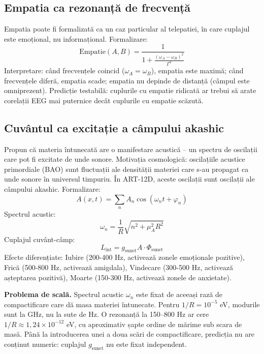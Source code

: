 \documentclass[11pt,a4paper]{article}
\begin{document}
\subsection{Empatia ca rezonanță de frecvență}
Empatia poate fi formalizată ca un caz particular al telepatiei, în care cuplajul este emoțional, nu informațional. Formalizare: 
\begin{equation}
\text{Empatie}(A,B) = \frac{1}{1 + \frac{(\omega_A - \omega_B)^2}{\Gamma^2}}
\end{equation}
Interpretare: când frecvențele coincid ($\omega_A = \omega_B$), empatia este maximă; când frecvențele diferă, empatia scade; empatia nu depinde de distanță (câmpul este omniprezent). Predicție testabilă: cuplurile cu empatie ridicată ar trebui să arate corelații EEG mai puternice decât cuplurile cu empatie scăzută.

\subsection{Cuvântul ca excitație a câmpului akashic}
Propun că materia întunecată are o manifestare acustică – un spectru de oscilații care pot fi excitate de unde sonore. Motivația cosmologică: oscilațiile acustice primordiale (BAO) sunt fluctuații ale densității materiei care s-au propagat ca unde sonore în universul timpuriu. În ART-12D, aceste oscilații sunt oscilații ale câmpului akashic. Formalizare:
\begin{equation}
A(x,t) = \sum_n A_n \cos(\omega_n t + \varphi_n)
\end{equation}
Spectrul acustic:
\begin{equation}
\omega_n = \frac{1}{R} \sqrt{n^2 + \mu_A^2 R^2}
\end{equation}
Cuplajul cuvânt-câmp:
\begin{equation}
L_{\text{int}} = g_{\text{sunet}} A \cdot \Phi_{\text{sunet}}
\end{equation}
Efecte diferențiate: Iubire (200-400 Hz, activează zonele emoționale pozitive), Frică (500-800 Hz, activează amigdala), Vindecare (300-500 Hz, activează așteptarea pozitivă), Moarte (150-300 Hz, activează zonele de anxietate).

\textbf{Problema de scală.} Spectrul acustic $\omega_n$ este fixat de aceeași rază de compactificare care dă masa materiei întunecate. Pentru $1/R = 10^{-5}$ eV, modurile sunt la GHz, nu la sute de Hz. O rezonanță la 150--800 Hz ar cere $1/R \approx 1{,}24\times10^{-12}$ eV, cu aproximativ șapte ordine de mărime sub scara de masă. Până la introducerea unei a doua scări de compactificare, predicția nu are conținut numeric: cuplajul $g_{\text{sunet}}$ nu este fixat independent.
\end{document}
